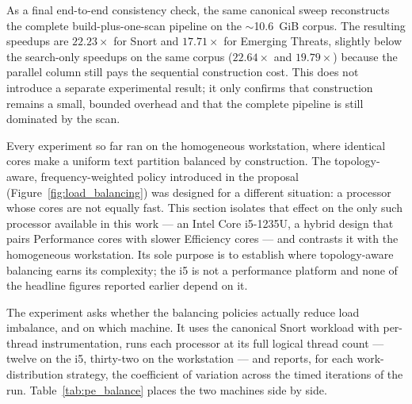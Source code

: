 As a final end-to-end consistency check, the same canonical sweep reconstructs the
complete build-plus-one-scan pipeline on the $\sim$10.6~GiB corpus. The resulting
speedups are $22.23\times$ for Snort and $17.71\times$ for Emerging Threats,
slightly below the search-only speedups on the same corpus ($22.64\times$ and
$19.79\times$) because the parallel column still pays the sequential construction
cost. This does not introduce a separate experimental result; it only confirms
that construction remains a small, bounded overhead and that the complete pipeline
is still dominated by the scan.

\label{subsec:heterogeneous}

Every experiment so far ran on the homogeneous workstation, where identical cores
make a uniform text partition balanced by construction. The topology-aware,
frequency-weighted policy introduced in the proposal
(Figure~\ref{fig:load_balancing}) was designed for a different situation: a
processor whose cores are not equally fast. This section isolates that effect on
the only such processor available in this work --- an Intel Core i5-1235U, a hybrid
design that pairs Performance cores with slower Efficiency cores --- and contrasts
it with the homogeneous workstation. Its sole purpose is to establish where
topology-aware balancing earns its complexity; the i5 is not a performance platform
and none of the headline figures reported earlier depend on it.

The experiment asks whether the balancing policies actually reduce load imbalance,
and on which machine. It uses the canonical Snort workload with per-thread
instrumentation, runs each processor at its full logical thread count --- twelve on
the i5, thirty-two on the workstation --- and reports, for each work-distribution
strategy, the coefficient of variation across the timed iterations of the run.
Table~\ref{tab:pe_balance} places the two machines side by side.

